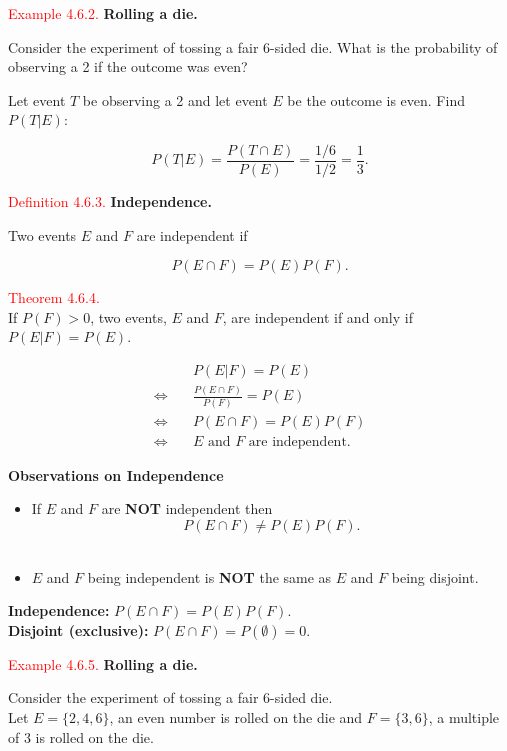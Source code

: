 \documentclass[
]{book}
\providecommand{\tightlist}{%
  \setlength{\itemsep}{0pt}\setlength{\parskip}{0pt}}
\begin{document}
\leavevmode{}%
\textcolor{red}{Example 4.6.2.}
{\textbf{Rolling a die.}}

Consider the experiment of tossing a fair 6-sided die. What is the probability of observing a 2 if the outcome was even?

Let event \(T\) be observing a 2 and let event \(E\) be the outcome is even. Find \(P(T|E)\):

\[P(T|E)=\frac{P(T \cap E)}{P(E)} = \frac{1/6}{1/2} = \frac{1}{3}.\]

\leavevmode{}%
\textcolor{red}{Definition 4.6.3.}
{\textbf{Independence.}}

Two events \(E\) and \(F\) are independent if

\[P(E\cap F)=P(E)P(F).\]

\leavevmode{}%
\textcolor{red}{Theorem 4.6.4.}\\
If \(P(F)>0\), two events, \(E\) and \(F\), are independent if and only if \(P(E|F)=P(E)\).

\begin{align*}
& P(E|F) = P(E) \\
\iff \quad & \frac{P(E \cap F)}{P(F)} = P(E) \\
\iff \quad & P(E \cap F) = P(E)P(F) \\
\iff \quad & E \text{ and } F \text{ are independent.}
\end{align*}

\hfill\break

\textbf{Observations on Independence}

\begin{itemize}
\tightlist
\item
  If \(E\) and \(F\) are \textbf{NOT} independent then
  \[
  P( E \cap F) \neq P(E)P (F).
  \]\\
\item
  \(E\) and \(F\) being independent is \textbf{NOT} the same as \(E\) and \(F\) being disjoint.
\end{itemize}

\textbf{Independence:} \(P( E \cap F) = P(E)P(F)\).\\
\textbf{Disjoint (exclusive):} \(P( E \cap F) = P (\emptyset) = 0\).

\leavevmode{}%
\textcolor{red}{Example 4.6.5.}
{\textbf{Rolling a die.}}

Consider the experiment of tossing a fair 6-sided die.\\
Let \(E= \{2,4,6\}\), an even number is rolled on the die and \(F= \{3,6\}\), a multiple of 3 is rolled on the die.
\end{document}
